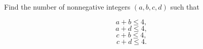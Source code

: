 Find the number of nonnegative integers $(a,b,c,d)$ such that

$$a+b\leq 4,$$$$a+d\leq 4,$$$$c+b\leq 4,$$$$c+d\leq 4.$$
